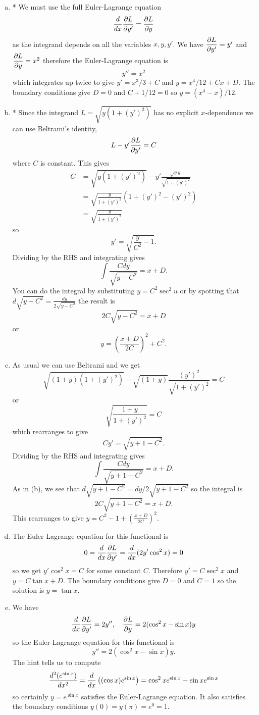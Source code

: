 \documentclass[12pt]{article}
\begin{document}
\begin{answer}
\begin{enumerate}[(a)]
\item * We must use the full Euler-Lagrange equation
\[\dfrac{d }{d x}\dfrac{\partial L}{\partial y'}=\dfrac{\partial L}{\partial y}\]
as the integrand depends on all the variables $x,y,y'$. We have $\dfrac{\partial L}{\partial y'}=y'$ and $\dfrac{\partial L}{\partial y}=x^2$ therefore the Euler-Lagrange equation is
\[y''=x^2\]
which integrates up twice to give $y'=x^3/3+C$ and $y=x^4/12+Cx+D$.
The boundary conditions give $D=0$ and $C+1/12=0$ so $y=(x^4-x)/12$.
\item * Since the integrand $L=\sqrt{y(1+(y')^2)}$ has no explicit $x$-dependence we can use Beltrami's identity,
\[L-y'\dfrac{\partial L}{\partial y'}=C\]
where $C$ is constant. This gives
\begin{align*}
C&=\sqrt{y(1+(y')^2)}-y'\frac{\sqrt{y}y'}{\sqrt{1+(y')^2}}\\
 &=\sqrt{\frac{y}{1+(y')^2}}\left(1+(y')^2-(y')^2\right)\\
 &=\sqrt{\frac{y}{1+(y')^2}}
\end{align*}
so
\[y'=\sqrt{\frac{y}{C^2}-1}.\]
Dividing by the RHS and integrating gives
\[\int\frac{Cdy}{\sqrt{y-C^2}}=x+D.\]
You can do the integral by substituting $y=C^2\sec^2u$ or by spotting that $d\sqrt{y-C^2}=\frac{dy}{2\sqrt{y-C^2}}$ the result is
\[2C\sqrt{y-C^2}=x+D\]
or
\[y=\left(\frac{x+D}{2C}\right)^2+C^2.\]
\item As usual we can use Beltrami and we get
\[\sqrt{(1+y)(1+(y')^2)}-\sqrt{(1+y)}\frac{(y')^2}{\sqrt{1+(y')^2}}=C\]
or
\[\sqrt{\frac{1+y}{1+(y')^2}}=C\]
which rearranges to give
\[Cy'=\sqrt{y+1-C^2}.\]
Dividing by the RHS and integrating gives
\[\int\frac{Cdy}{\sqrt{y+1-C^2}}=x+D.\]
As in (b), we see that $d\sqrt{y+1-C^2}=dy/2\sqrt{y+1-C^2}$ so the integral is
\[2C\sqrt{y+1-C^2}=x+D.\]
This rearranges to give $y=C^2-1+\left(\frac{x+D}{2C}\right)^2$.
\item The Euler-Lagrange equation for this functional is
\[0=\dfrac{d }{d x}\dfrac{\partial L}{\partial y'}=\dfrac{d }{d x}(2y'\cos^2x)=0\]
so we get $y'\cos^2 x=C$ for some constant $C$. Therefore $y'=C\sec^2x$ and $y=C\tan x+D$. The boundary conditions give $D=0$ and $C=1$ so the solution is $y=\tan x$.
\item We have
\[\dfrac{d }{d x}\dfrac{\partial L}{\partial y'}=2y'',\quad\dfrac{\partial L}{\partial y}=2(\cos^2x-\sin x)y\]
so the Euler-Lagrange equation for this functional is
\[y''=2(\cos^2x-\sin x)y.\]
The hint tells us to compute
\[\dfrac{d^2 (e^{\sin x})}{d x^2}=\dfrac{d }{d x}\left((\cos x)e^{\sin x}\right)=\cos^2xe^{\sin x}-\sin xe^{\sin x}\]
so certainly $y=e^{\sin x}$ satisfies the Euler-Lagrange equation. It also satisfies the boundary conditions $y(0)=y(\pi)=e^0=1$.
\end{enumerate}
\end{answer}
\end{document}
